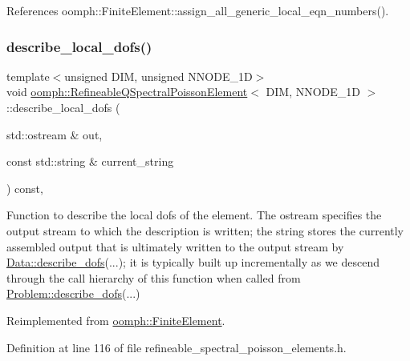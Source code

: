 References oomph\+::\+Finite\+Element\+::assign\+\_\+all\+\_\+generic\+\_\+local\+\_\+eqn\+\_\+numbers().

\mbox{\label{classoomph_1_1RefineableQSpectralPoissonElement_abcb898df228c936e96d47f0b3e790078}} 
\subsubsection{\texorpdfstring{describe\+\_\+local\+\_\+dofs()}{describe\_local\_dofs()}}
{\footnotesize\ttfamily template$<$unsigned D\+IM, unsigned N\+N\+O\+D\+E\+\_\+1D$>$ \\
void \hyperlink{classoomph_1_1RefineableQSpectralPoissonElement}{oomph\+::\+Refineable\+Q\+Spectral\+Poisson\+Element}$<$ D\+IM, N\+N\+O\+D\+E\+\_\+1D $>$\+::describe\+\_\+local\+\_\+dofs (\begin{DoxyParamCaption}\item[{std\+::ostream \&}]{out,  }\item[{const std\+::string \&}]{current\+\_\+string }\end{DoxyParamCaption}) const\hspace{0.3cm}{\ttfamily [inline]}, {\ttfamily [virtual]}}



Function to describe the local dofs of the element. The ostream specifies the output stream to which the description is written; the string stores the currently assembled output that is ultimately written to the output stream by \hyperlink{classoomph_1_1Data_a2dae16e2dcff9a40029f834c83364df5}{Data\+::describe\+\_\+dofs}(...); it is typically built up incrementally as we descend through the call hierarchy of this function when called from \hyperlink{classoomph_1_1Problem_abc103804eb319ae0b3d43870cc3e1eaf}{Problem\+::describe\+\_\+dofs}(...) 



Reimplemented from \hyperlink{classoomph_1_1FiniteElement_aad9f9ebb2996fd9c44caf34da8bc7941}{oomph\+::\+Finite\+Element}.



Definition at line 116 of file refineable\+\_\+spectral\+\_\+poisson\+\_\+elements.\+h.



